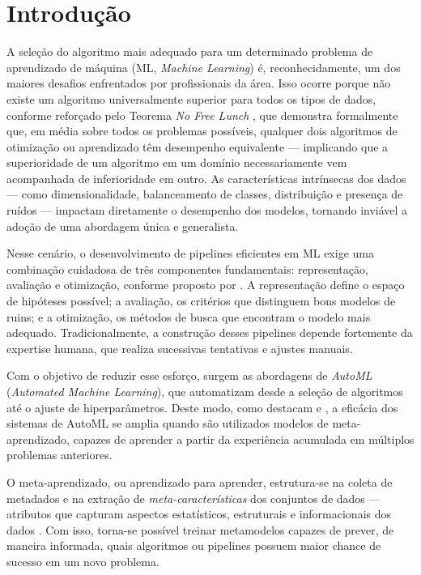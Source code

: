 \chapter{Introdução}\label{cap:introducao}

A seleção do algoritmo mais adequado para um determinado problema de aprendizado de máquina (ML, \textit{Machine Learning}) é, reconhecidamente, um dos maiores desafios enfrentados por profissionais da área. Isso ocorre porque não existe um algoritmo universalmente superior para todos os tipos de dados, conforme reforçado pelo Teorema \textit{No Free Lunch} , que demonstra formalmente que, em média sobre todos os problemas possíveis, qualquer dois algoritmos de otimização ou aprendizado têm desempenho equivalente — implicando que a superioridade de um algoritmo em um domínio necessariamente vem acompanhada de inferioridade em outro. As características intrínsecas dos dados — como dimensionalidade, balanceamento de classes, distribuição e presença de ruídos — impactam diretamente o desempenho dos modelos, tornando inviável a adoção de uma abordagem única e generalista.

Nesse cenário, o desenvolvimento de pipelines eficientes em ML exige uma combinação cuidadosa de três componentes fundamentais: representação, avaliação e otimização, conforme proposto por . A representação define o espaço de hipóteses possível; a avaliação, os critérios que distinguem bons modelos de ruins; e a otimização, os métodos de busca que encontram o modelo mais adequado. Tradicionalmente, a construção desses pipelines depende fortemente da expertise humana, que realiza sucessivas tentativas e ajustes manuais.

Com o objetivo de reduzir esse esforço, surgem as abordagens de \textit{AutoML} (\textit{Automated Machine Learning}), que automatizam desde a seleção de algoritmos até o ajuste de hiperparâmetros. Deste modo, como destacam  e , a eficácia dos sistemas de AutoML se amplia quando são utilizados modelos de meta-aprendizado, capazes de aprender a partir da experiência acumulada em múltiplos problemas anteriores.

O meta-aprendizado, ou aprendizado para aprender, estrutura-se na coleta de metadados e na extração de \textit{meta-características} dos conjuntos de dados — atributos que capturam aspectos estatísticos, estruturais e informacionais dos dados . Com isso, torna-se possível treinar metamodelos capazes de prever, de maneira informada, quais algoritmos ou pipelines possuem maior chance de sucesso em um novo problema.

